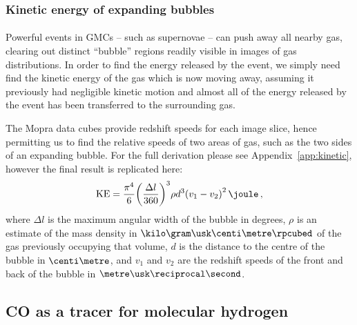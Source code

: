 \documentclass[a4paper, titlepage, oneside]{article}
\begin{document}
\begin{multicols}{2}
\subsubsection{Kinetic energy of expanding bubbles}
\label{sec:kinetic}
\paragraph{}
Powerful events in GMCs -- such as supernovae -- can push away all nearby gas, clearing out distinct ``bubble'' regions readily visible in images of gas distributions. In order to find the energy released by the event, we simply need find the kinetic energy of the gas which is now moving away, assuming it previously had negligible kinetic motion and almost all of the energy released by the event has been transferred to the surrounding gas.

The Mopra data cubes provide redshift speeds for each image slice, hence permitting us to find the relative speeds of two areas of gas, such as the two sides of an expanding bubble. For the full derivation please see Appendix~\ref{app:kinetic}, however the final result is replicated here:
\begin{equation}
  \mathrm{KE} = \frac{\pi ^ 4}{6} {\left( \frac{\Delta l}{360} \right)}^3 \rho d^3 {(v_1 - v_2)}^2 \, \joule \, ,
\end{equation}
where \(\Delta l\) is the maximum angular width of the bubble in degrees, \(\rho\) is an estimate of the mass density in \(\kilo\gram\usk\centi\metre\rpcubed\) of the gas previously occupying that volume, \(d\) is the distance to the centre of the bubble in \(\centi\metre\), and \(v_1\) and \(v_2\) are the redshift speeds of the front and back of the bubble in \(\metre\usk\reciprocal\second\).

\subsection{CO as a tracer for molecular hydrogen}
\label{sec:co}

\end{multicols}
\end{document}
